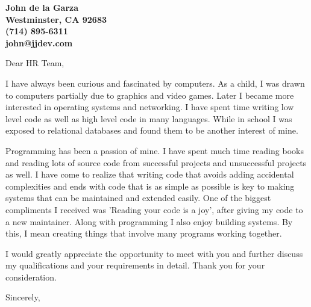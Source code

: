 \documentclass[12pt]{letter} %
\begin{document}
\begin{letter}{}

\begin{center}
	\large\bfseries %
	John de la Garza \\ %
	Westminster, CA 92683 \\
	(714) 895-6311 \\
        john@jjdev.com
\end{center}

\vspace{1cm} %

\signature{John de la Garza} %


\opening{Dear HR Team,}

I have always been curious and fascinated by computers.
As a child, I was drawn to computers partially due to graphics and
video games.  Later I became more interested in operating systems and
networking.  I have spent time writing low level code as
well as high level code in many languages.  While in school I was exposed
to relational databases and found them to be another interest of mine.

Programming has been a passion of mine.  I have spent much time reading
books and reading lots of source code from successful projects and
unsuccessful projects as well.  I have come to realize that writing code
that avoids adding accidental complexities and ends with code that is
as simple as possible is key to making systems that can be maintained
and extended easily.  One of the biggest compliments I received was
'Reading your code is a joy', after giving my code to a new maintainer.
Along with programming I also enjoy building systems.  By this, I mean
creating things that involve many programs working together.

I would greatly appreciate the opportunity to meet with you and further
discuss my qualifications and your requirements in detail.  Thank you
for your consideration.


\closing{Sincerely,}

\end{letter}
\end{document}
